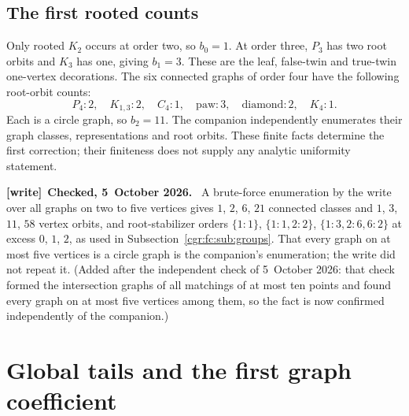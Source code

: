 \documentclass[11pt,letterpaper]{article}
\numberwithin{equation}{section}
\theoremstyle{definition}\newtheorem{definition}[theorem]{Definition}
\theoremstyle{remark}\newtheorem{remark}[theorem]{Remark}
\newenvironment{writenote}[1][]{\par\smallskip\begingroup\small
 \noindent\textbf{[write]}\if\relax\detokenize{#1}\relax\else~\textbf{#1.}\fi\ }%
 {\par\endgroup\smallskip}
\begin{document}
\subsection{The first rooted counts}\label{cgr:fc:sub:rooted}
Only rooted $K_2$ occurs at order two, so $b_0=1$.
At order three, $P_3$ has two root orbits and $K_3$ has one,
giving $b_1=3$. These are the leaf, false-twin and true-twin
one-vertex decorations. The six connected graphs of order four
have the following root-orbit counts:
\[
 P_4:2,\quad K_{1,3}:2,\quad C_4:1,\quad
 \text{paw}:3,\quad\text{diamond}:2,\quad K_4:1.
\]
Each is a circle graph, so $b_2=11$.
The companion independently enumerates their graph classes,
representations and root orbits. These finite facts determine the
first correction; their finiteness does not supply any analytic
uniformity statement.
\begin{writenote}[Checked, 5~October 2026]
A brute-force enumeration by the write over all graphs on two to five vertices gives $1$, $2$, $6$, $21$ connected classes and $1$, $3$, $11$, $58$ vertex orbits, and root-stabilizer orders $\{1{:}1\}$, $\{1{:}1,2{:}2\}$, $\{1{:}3,2{:}6,6{:}2\}$ at excess $0$, $1$, $2$, as used in Subsection~\ref{cgr:fc:sub:groups}. That every graph on at most five vertices is a circle graph is the companion's enumeration; the write did not repeat it. \textup{(Added after the independent check of 5~October 2026: that check formed the intersection graphs of all matchings of at most ten points and found every graph on at most five vertices among them, so the fact is now confirmed independently of the companion.)}
\end{writenote}

\section{Global tails and the first graph coefficient}\label{cgr:fc:sec:coeff}
\end{document}
